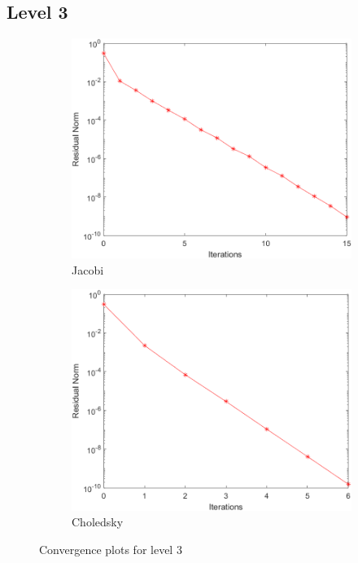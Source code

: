\documentclass[a4paper, 11pt]{article}
\begin{document}
			\subsection*{Level 3}
				\begin{figure}[H]
					\begin{subfigure}{.49\textwidth}
						\centering
						\includegraphics[width=.99\linewidth]{img3/J.png}  
						\caption{Jacobi}
						\label{fig:Jacobi_3}
					\end{subfigure}
					\begin{subfigure}{.49\textwidth}
						\centering
						\includegraphics[width=.99\linewidth]{img3/C.png}  
						\caption{Choledsky}
						\label{fig:Chol_3}
					\end{subfigure}
					\caption{Convergence plots for level 3}
					\label{fig:fig3}
				\end{figure}
			
\end{document}
